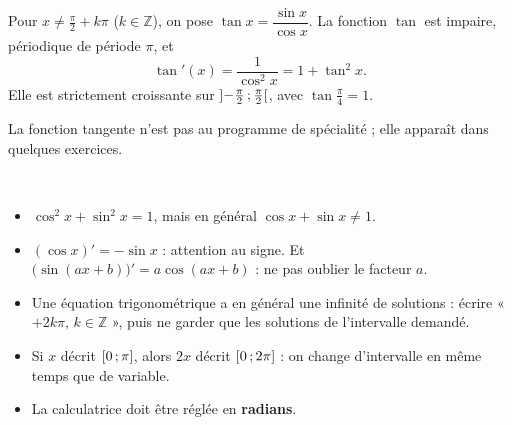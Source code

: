 \noindent
\begin{minipage}[c]{0.55\linewidth}
\raggedright
\begin{definition}
\raggedright
Pour $x\neq\frac{\pi}{2}+k\pi$ ($k\in\mathbb{Z}$), on pose $\tan x=\dfrac{\sin x}{\cos x}$. La fonction $\tan$ est impaire,
périodique de période $\pi$, et
\[ \tan'(x)=\frac{1}{\cos^{2}x}=1+\tan^{2}x. \]
Elle est strictement croissante sur $\mathopen{]}-\frac{\pi}{2}\,{;}\,\frac{\pi}{2}\mathclose{[}$, avec $\tan\frac{\pi}{4}=1$.
\end{definition}
{\small\color{otMuted}La fonction tangente n'est pas au programme de spécialité ; elle apparaît dans quelques exercices.}
\end{minipage}\hfill
\begin{minipage}[c]{0.41\linewidth}
\centering
{}\\[0.5mm]
\end{minipage}

\begin{attention}
\begin{itemize}[label={\color{otOrange}\textbullet},leftmargin=1.4em,itemsep=0.6mm,topsep=0.5mm]
  \item $\cos^{2}x+\sin^{2}x=1$, mais en général $\cos x+\sin x\neq1$.
  \item $(\cos x)'=-\sin x$ : attention au signe. Et $\big(\sin(ax+b)\big)'=a\cos(ax+b)$ : ne pas oublier le facteur $a$.
  \item Une équation trigonométrique a en général une infinité de solutions : écrire « $+2k\pi$, $k\in\mathbb{Z}$ », puis ne
    garder que les solutions de l'intervalle demandé.
  \item Si $x$ décrit $\mathopen{[}0\,{;}\,\pi\mathclose{]}$, alors $2x$ décrit $\mathopen{[}0\,{;}\,2\pi\mathclose{]}$ : on change d'intervalle en même temps que de variable.
  \item La calculatrice doit être réglée en \textbf{radians}.
\end{itemize}
\end{attention}

